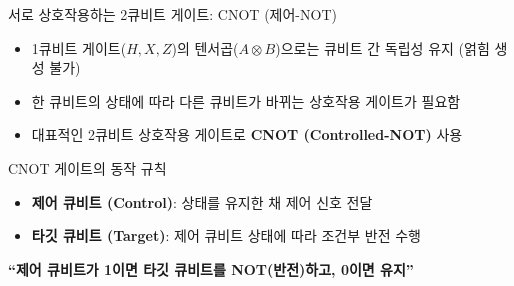 \documentclass[aspectratio=169, 10pt]{beamer}
\begin{document}
\begin{frame}{서로 상호작용하는 2큐비트 게이트: CNOT (제어-NOT)}
    \begin{itemize}
        \item 1큐비트 게이트($H, X, Z$)의 텐서곱($A \otimes B$)으로는 큐비트 간 독립성 유지 (얽힘 생성 불가)
        \pause
        \item 한 큐비트의 상태에 따라 다른 큐비트가 바뀌는 상호작용 게이트가 필요함
        \pause
        \item 대표적인 2큐비트 상호작용 게이트로 \textbf{CNOT (Controlled-NOT)} 사용
    \end{itemize}
    \pause
    \vspace{0.15cm}
    \begin{qcalert}{CNOT 게이트의 동작 규칙}
        \begin{itemize}
            \item \textbf{제어 큐비트 (Control)}: 상태를 유지한 채 제어 신호 전달
            \pause
            \item \textbf{타깃 큐비트 (Target)}: 제어 큐비트 상태에 따라 조건부 반전 수행
        \end{itemize}
        \begin{center}
            \Large \color{qcAccentBlue} \textbf{``제어 큐비트가 1이면 타깃 큐비트를 NOT(반전)하고, 0이면 유지''}
        \end{center}
    \end{qcalert}
\end{frame}
\end{document}
